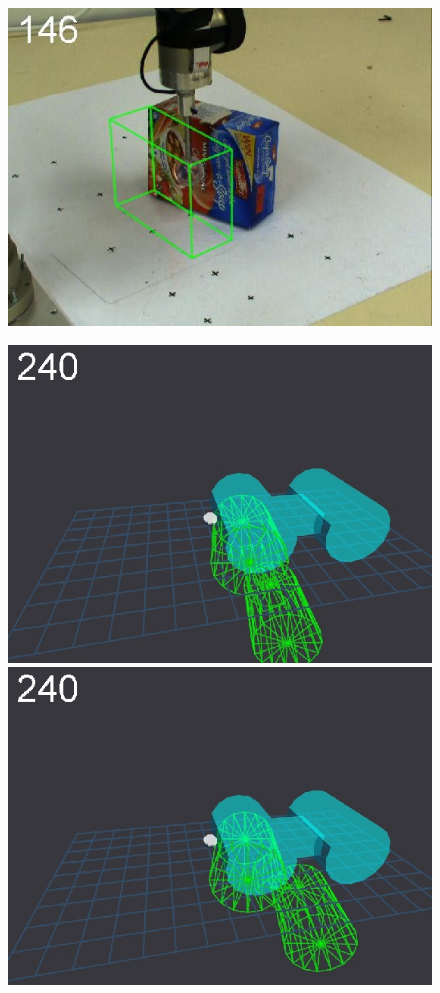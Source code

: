 \begin{figure}[t]
{\includegraphics[width=\imgCXwid]{./C1_LWPR1_87_3}
}
\centerline{
\includegraphics[width=\imgCXwid]{./C5_1exp_6_4}
\includegraphics[width=\imgCXwid]{./C5_2exp_6_4}
}
\end{figure}
